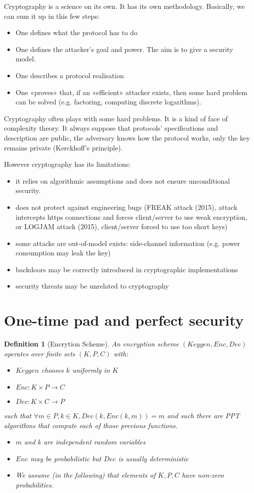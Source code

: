 \documentclass{article}
\newtheorem{defi}[thm]{Definition}
\newcommand{\Def}[3]{\begin{defi}[#1]\label{#2}#3\end{defi}}
\begin{document}
Cryptography is a science on its own. It has its own methodology. Basically, we can sum it up in this few steps:
\begin{itemize}
\item One defines what the protocol has to do
\item One defines the attacker's goal and power. The aim is to give a security model.
\item One describes a protocol realisation
\item One «proves» that, if an «efficient» attacker exists, then some hard problem can be solved (e.g. factoring, computing discrete logarithms).
\end{itemize}

Cryptography often plays with some hard problems. It is a kind of face of complexity theory. It always suppose that protocols' specifications and description are public, the adversary knows how the protocol works, only the key remains private (Kerckhoff's principle).

However cryptography has its limitations:
\begin{itemize}
\item it relies on algorithmic assumptions and does not ensure unconditional security.
\item does not protect against engineering bugs (FREAK attack (2015), attack intercepts https connections and forces client/server to use weak encryption, or LOGJAM attack (2015), client/server forced to use too short keys)
\item some attacks are out-of-model exists: side-channel information (e.g. power consumption may leak the key)
\item backdoors may be correctly introduced in cryptographic implementations
\item security threats may be unrelated to cryptography
\end{itemize}

\section{One-time pad and perfect security}
\Def{Encrytion Scheme}{def:encrysch}{An encryption scheme $(Keygen, Enc, Dec)$ operates over finite sets $(K,P,C)$ with:
\begin{itemize}
\item $Keygen$ chooses $k$ uniformly in $K$
\item $Enc : K\times P \rightarrow C$
\item $Dec : K\times C \rightarrow P$
\end{itemize}
such that $\forall m\in P, k\in K, Dec(k,Enc(k,m))=m$ and such there are PPT algorithms that compute each of those previous functions.
\begin{itemize}
\item $m$ and $k$ are independent random variables
\item $Enc$ may be probabilistic but $Dec$ is usually deterministic
\item We assume (in the following) that elements of $K,P,C$ have non-zero probabilities.
\end{itemize}}
\end{document}
